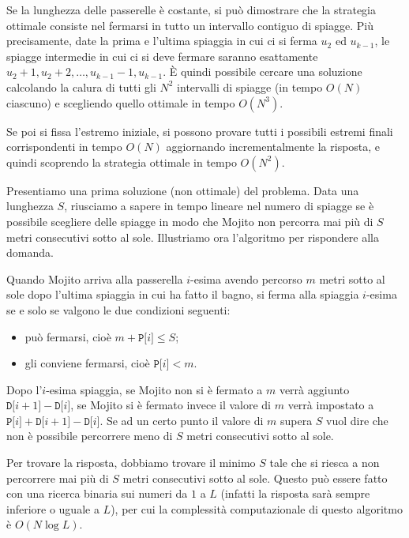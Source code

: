 Se la lunghezza delle passerelle è costante, si può dimostrare che la strategia ottimale consiste nel fermarsi in tutto un intervallo contiguo di spiagge. Più precisamente, date la prima e l'ultima spiaggia in cui ci si ferma $u_2$ ed $u_{k-1}$, le spiagge intermedie in cui ci si deve fermare saranno esattamente $u_2+1, u_2+2, \ldots, u_{k-1} - 1, u_{k-1}$. È quindi possibile cercare una soluzione calcolando la calura di tutti gli $N^2$ intervalli di spiagge (in tempo $O(N)$ ciascuno) e scegliendo quello ottimale in tempo $O(N^3)$.

Se poi si fissa l'estremo iniziale, si possono provare tutti i possibili estremi finali corrispondenti in tempo $O(N)$ aggiornando incrementalmente la risposta, e quindi scoprendo la strategia ottimale in tempo $O(N^2)$.


\RicBinaria

Presentiamo una prima soluzione (non ottimale) del problema. Data una lunghezza $S$, riusciamo a sapere in tempo lineare nel numero di spiagge se è possibile scegliere delle spiagge in modo che Mojito non percorra mai più di $S$ metri consecutivi sotto al sole. Illustriamo ora l'algoritmo per rispondere alla domanda. 

Quando Mojito arriva alla passerella $i$-esima avendo percorso $m$ metri sotto al sole dopo l'ultima spiaggia in cui ha fatto il bagno, si ferma alla spiaggia $i$-esima se e solo se valgono le due condizioni seguenti:
\begin{itemize}
	\item può fermarsi, cioè $ m + \texttt{P[}i\texttt{]} \le S$;
	\item gli conviene fermarsi, cioè $\texttt{P[}i\texttt{]} < m$.
\end{itemize}
Dopo l'$i$-esima spiaggia, se Mojito non si è fermato a $m$ verrà aggiunto $\texttt{D[}i+1\texttt{]} - \texttt{D[}i\texttt{]}$, se Mojito si è fermato invece il valore di $m$ verrà impostato a $\texttt{P[}i\texttt{]} + \texttt{D[}i+1\texttt{]} - \texttt{D[}i\texttt{]}$. Se ad un certo punto il valore di $m$ supera $S$ vuol dire che non è possibile percorrere meno di $S$ metri consecutivi sotto al sole.

Per trovare la risposta, dobbiamo trovare il minimo $S$ tale che si riesca a non percorrere mai più di $S$ metri consecutivi sotto al sole. Questo può essere fatto con una ricerca binaria sui numeri da $1$ a $L$ (infatti la risposta sarà sempre inferiore o uguale a $L$), per cui la complessità computazionale di questo algoritmo è $O(N \log L)$.

